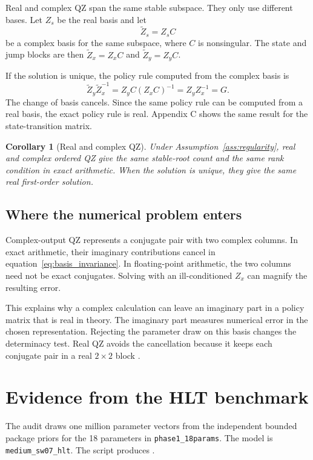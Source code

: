 \documentclass[11pt]{article}
\newtheorem{corollary}{Corollary}
\begin{document}
Real and complex QZ span the same stable subspace. They only use different
bases. Let $Z_s$ be the real basis and let
\[
    \widetilde Z_s=Z_sC
\]
be a complex basis for the same subspace, where $C$ is nonsingular. The state
and jump blocks are then $\widetilde Z_x=Z_xC$ and
$\widetilde Z_y=Z_yC$.

If the solution is unique, the policy rule computed from the complex basis is
\begin{equation}
    \widetilde Z_y\widetilde Z_x^{-1}
    =Z_yC(Z_xC)^{-1}
    =Z_yZ_x^{-1}
    =G.
    \label{eq:basis_invariance}
\end{equation}
The change of basis cancels. Since the same policy rule can be computed from a
real basis, the exact policy rule is real. Appendix C shows the same result for
the state-transition matrix.

\begin{corollary}[Real and complex QZ]\label{cor:qz}
Under Assumption~\ref{ass:regularity}, real and complex ordered QZ give the
same stable-root count and the same rank condition in exact arithmetic. When
the solution is unique, they give the same real first-order solution.
\end{corollary}

\subsection{Where the numerical problem enters}

Complex-output QZ represents a conjugate pair with two complex columns. In
exact arithmetic, their imaginary contributions cancel in
equation~\eqref{eq:basis_invariance}. In floating-point arithmetic, the two
columns need not be exact conjugates. Solving with an ill-conditioned $Z_x$
can magnify the resulting error.

This explains why a complex calculation can leave an imaginary part in a
policy matrix that is real in theory. The imaginary part measures numerical
error in the chosen representation. Rejecting the parameter draw on this basis
changes the determinacy test. Real QZ avoids the cancellation because it keeps
each conjugate pair in a real $2\times2$ block \cite{lapack1999}.

\section{Evidence from the HLT benchmark}

The audit draws one million parameter vectors from the independent bounded
package priors for the 18 parameters in \texttt{phase1\_18params}. The model is
\texttt{medium\_sw07\_hlt}. The script
 produces
.
\end{document}
